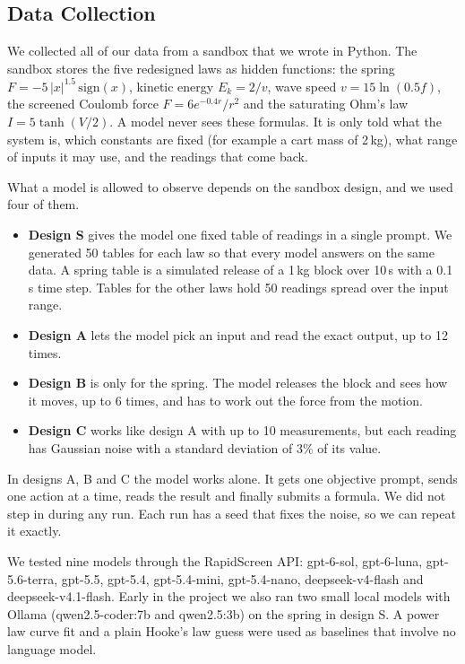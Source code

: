 \subsection{Data Collection}

We collected all of our data from a sandbox that we wrote in Python. The sandbox stores the five redesigned laws as hidden functions: the spring $F = -5\,|x|^{1.5}\,\mathrm{sign}(x)$, kinetic energy $E_k = 2/v$, wave speed $v = 15\ln(0.5f)$, the screened Coulomb force $F = 6e^{-0.4r}/r^2$ and the saturating Ohm's law $I = 5\tanh(V/2)$. A model never sees these formulas. It is only told what the system is, which constants are fixed (for example a cart mass of 2\,kg), what range of inputs it may use, and the readings that come back.

What a model is allowed to observe depends on the sandbox design, and we used four of them.
\begin{itemize}
  \item \textbf{Design S} gives the model one fixed table of readings in a single prompt. We generated 50 tables for each law so that every model answers on the same data. A spring table is a simulated release of a 1\,kg block over 10\,s with a 0.1\,s time step. Tables for the other laws hold 50 readings spread over the input range.
  \item \textbf{Design A} lets the model pick an input and read the exact output, up to 12 times.
  \item \textbf{Design B} is only for the spring. The model releases the block and sees how it moves, up to 6 times, and has to work out the force from the motion.
  \item \textbf{Design C} works like design A with up to 10 measurements, but each reading has Gaussian noise with a standard deviation of 3\% of its value.
\end{itemize}

In designs A, B and C the model works alone. It gets one objective prompt, sends one action at a time, reads the result and finally submits a formula. We did not step in during any run. Each run has a seed that fixes the noise, so we can repeat it exactly.

We tested nine models through the RapidScreen API: gpt-6-sol, gpt-6-luna, gpt-5.6-terra, gpt-5.5, gpt-5.4, gpt-5.4-mini, gpt-5.4-nano, deepseek-v4-flash and deepseek-v4.1-flash. Early in the project we also ran two small local models with Ollama (qwen2.5-coder:7b and qwen2.5:3b) on the spring in design S. A power law curve fit and a plain Hooke's law guess were used as baselines that involve no language model.


